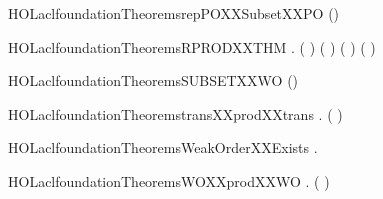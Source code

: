 \newcommand{\HOLaclfoundationTheoremsrepPOXXprodXXPO}{\UseVerbatim{HOLaclfoundationTheoremsrepPOXXprodXXPO}}
\begin{SaveVerbatim}{HOLaclfoundationTheoremsrepPOXXSubsetXXPO}
\HOLTokenTurnstile{}   \HOLSymConst{=} (\HOLConst{\HOLTokenSubset{}})
\end{SaveVerbatim}
\newcommand{\HOLaclfoundationTheoremsrepPOXXSubsetXXPO}{\UseVerbatim{HOLaclfoundationTheoremsrepPOXXSubsetXXPO}}
\begin{SaveVerbatim}{HOLaclfoundationTheoremsRPRODXXTHM}
\HOLTokenTurnstile{} \HOLSymConst{\HOLTokenForall{}}   .
          \HOLSymConst{\HOLTokenEquiv{}}  ( ) ( ) \HOLSymConst{\HOLTokenConj{}}  ( ) ( )
\end{SaveVerbatim}
\newcommand{\HOLaclfoundationTheoremsRPRODXXTHM}{\UseVerbatim{HOLaclfoundationTheoremsRPRODXXTHM}}
\begin{SaveVerbatim}{HOLaclfoundationTheoremsSUBSETXXWO}
\HOLTokenTurnstile{}  (\HOLConst{\HOLTokenSubset{}})
\end{SaveVerbatim}
\newcommand{\HOLaclfoundationTheoremsSUBSETXXWO}{\UseVerbatim{HOLaclfoundationTheoremsSUBSETXXWO}}
\begin{SaveVerbatim}{HOLaclfoundationTheoremstransXXprodXXtrans}
\HOLTokenTurnstile{} \HOLSymConst{\HOLTokenForall{}} .   \HOLSymConst{\HOLTokenConj{}}   \HOLSymConst{\HOLTokenImp{}}  (  )
\end{SaveVerbatim}
\newcommand{\HOLaclfoundationTheoremstransXXprodXXtrans}{\UseVerbatim{HOLaclfoundationTheoremstransXXprodXXtrans}}
\begin{SaveVerbatim}{HOLaclfoundationTheoremsWeakOrderXXExists}
\HOLTokenTurnstile{} \HOLSymConst{\HOLTokenExists{}}.  
\end{SaveVerbatim}
\newcommand{\HOLaclfoundationTheoremsWeakOrderXXExists}{\UseVerbatim{HOLaclfoundationTheoremsWeakOrderXXExists}}
\begin{SaveVerbatim}{HOLaclfoundationTheoremsWOXXprodXXWO}
\HOLTokenTurnstile{} \HOLSymConst{\HOLTokenForall{}} .   \HOLSymConst{\HOLTokenConj{}}   \HOLSymConst{\HOLTokenImp{}}  (  )
\end{SaveVerbatim}

